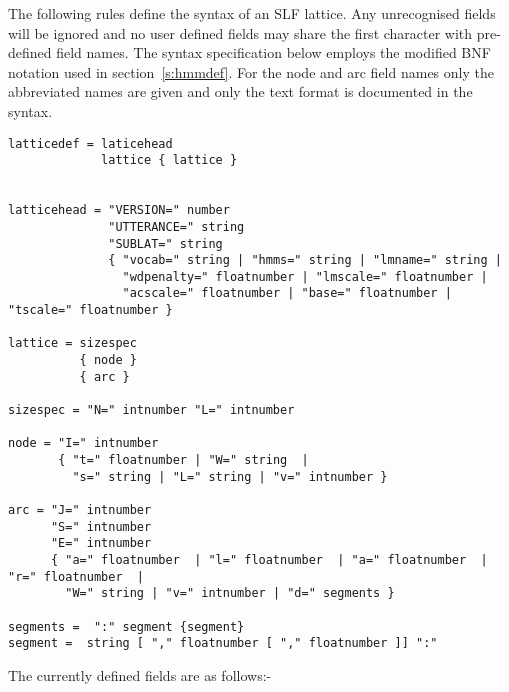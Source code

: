 
The following rules define the syntax of an SLF
lattice. Any unrecognised fields will be ignored and no user defined
fields may share the first character with pre-defined field names. The
syntax specification below employs the modified BNF notation used in
section~\ref{s:hmmdef}. For the node and arc field names only the
abbreviated names are given and only the text format is documented in
the syntax.


\begin{verbatim}
latticedef = laticehead
             lattice { lattice }


latticehead = "VERSION=" number 
              "UTTERANCE=" string
              "SUBLAT=" string
              { "vocab=" string | "hmms=" string | "lmname=" string |
                "wdpenalty=" floatnumber | "lmscale=" floatnumber |
                "acscale=" floatnumber | "base=" floatnumber | "tscale=" floatnumber }

lattice = sizespec
          { node }
          { arc }

sizespec = "N=" intnumber "L=" intnumber

node = "I=" intnumber 
       { "t=" floatnumber | "W=" string  | 
         "s=" string | "L=" string | "v=" intnumber } 

arc = "J=" intnumber 
      "S=" intnumber 
      "E=" intnumber 
      { "a=" floatnumber  | "l=" floatnumber  | "a=" floatnumber  | "r=" floatnumber  |
        "W=" string | "v=" intnumber | "d=" segments }

segments =  ":" segment {segment}
segment =  string [ "," floatnumber [ "," floatnumber ]] ":"
\end{verbatim}



The currently defined fields are as follows:-

